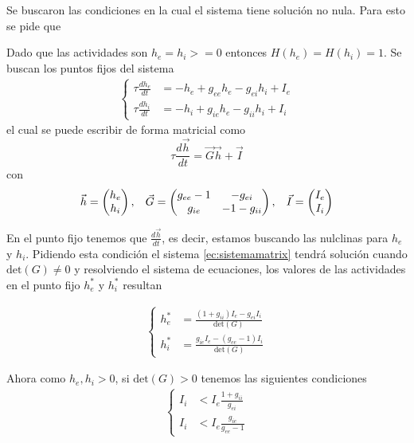 \documentclass[11pt,twocolumn,twoside]{opticajnl}
\begin{document}
Se buscaron las condiciones en la cual el sistema tiene solución no nula. Para esto se pide que 

Dado que las actividades son $h_e = h_i >=0$ entonces $H(h_e) = H(h_i) = 1$. Se buscan los puntos fijos del sistema 
\begin{align}
    \left\{
    \begin{aligned}
        \tau \frac{d h_e}{dt} &= -h_e + g_{ee}h_e - g_{ei}h_i + I_e \\
        \tau \frac{d h_i}{dt} &= -h_i + g_{ie}h_e - g_{ii}h_i + I_i 
    \end{aligned}
    \right.
    \label{ec:sistema2}
\end{align}
el cual se puede escribir de forma matricial como 
\begin{equation}
    \tau \frac{d \vec{h}}{dt} = \vec{G} \vec{h} + \vec{I}
    \label{ec:sistemamatrix}
\end{equation}
con 
\[
\vec{h} = \begin{pmatrix} h_e \\ h_i \end{pmatrix}, \hspace{0.3cm}
\vec{G} = \begin{pmatrix} g_{ee} - 1 & -g_{ei} \\ g_{ie} & -1-g_{ii} \end{pmatrix}, \hspace{0.3cm}
\vec{I} = \begin{pmatrix} I_e \\ I_i \end{pmatrix}
\]

En el punto fijo tenemos que $ \frac{d \vec{h}}{dt} $, es decir, estamos buscando las nulclinas para $h_e$ y $h_i$. Pidiendo esta condición el sistema \ref{ec:sistemamatrix} tendrá solución cuando $\text{det}(G) \neq 0$ y resolviendo el sistema de ecuaciones, los valores de las actividades en el punto fijo $h_e^*$ y $h_i^*$ resultan

\begin{align}
    \left\{
    \begin{aligned}
        h_e^* &= \frac{ (1+g_{ii}) I_e - g_{ei}I_i }{\text{det}(G)} \\
        h_i^* &= \frac{ g_{ie} I_e - (g_{ee}-1)I_i }{\text{det}(G)}
    \end{aligned}
    \right.
    \label{ec:puntofijo}
\end{align}

Ahora como $h_e,h_i > 0$, si $\text{det}(G) > 0$ tenemos las siguientes condiciones
\begin{align}
    \left\{
    \begin{aligned}
        I_i &< I_e \frac{1+g_{ii}}{g_{ei}}\\
        I_i &< I_e \frac{g_{ie}}{g_{ee}-1}
    \end{aligned}
    \right.
\end{align}
\end{document}
